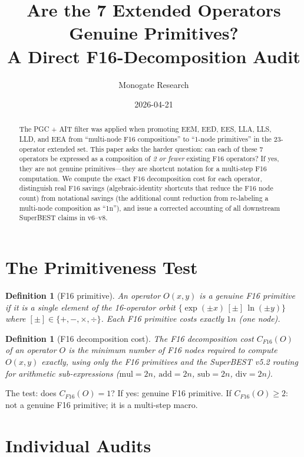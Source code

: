 \documentclass[11pt]{article}
\title{Are the 7 Extended Operators Genuine Primitives?\\
A Direct F16-Decomposition Audit}
\author{Monogate Research}
\date{2026-04-21}
\newtheorem{definition}[theorem]{Definition}
\begin{document}
\maketitle

\begin{abstract}
The PGC + AIT filter was applied when promoting EEM, EED, EES, LLA, LLS, LLD, and EEA
from ``multi-node F16 compositions'' to ``1-node primitives'' in the 23-operator extended set.
This paper asks the harder question: can each of these 7 operators be expressed as a
composition of \emph{2 or fewer} existing F16 operators?
If yes, they are not genuine primitives---they are shortcut notation for a
multi-step F16 computation.
We compute the exact F16 decomposition cost for each operator, distinguish real F16 savings
(algebraic-identity shortcuts that reduce the F16 node count) from notational savings
(the additional count reduction from re-labeling a multi-node composition as ``1n''),
and issue a corrected accounting of all downstream SuperBEST claims in v6--v8.
\end{abstract}

\section{The Primitiveness Test}

\begin{definition}[F16 primitive]
An operator $O(x,y)$ is a \emph{genuine F16 primitive} if it is a single element of the
16-operator orbit $\{\exp(\pm x)\,[\pm]\,\ln(\pm y)\}$ where $[\pm]\in\{+,-,\times,\div\}$.
Each F16 primitive costs exactly $1n$ (one node).
\end{definition}

\begin{definition}[F16 decomposition cost]
The \emph{F16 decomposition cost} $C_{F16}(O)$ of an operator $O$ is the minimum number
of F16 nodes required to compute $O(x,y)$ exactly, using only the F16 primitives and
the SuperBEST v5.2 routing for arithmetic sub-expressions
($\mathrm{mul}=2n$, $\mathrm{add}=2n$, $\mathrm{sub}=2n$, $\mathrm{div}=2n$).
\end{definition}

The test: does $C_{F16}(O)=1$? If yes: genuine F16 primitive.
If $C_{F16}(O)\geq2$: not a genuine F16 primitive; it is a multi-step macro.

\section{Individual Audits}
\end{document}
